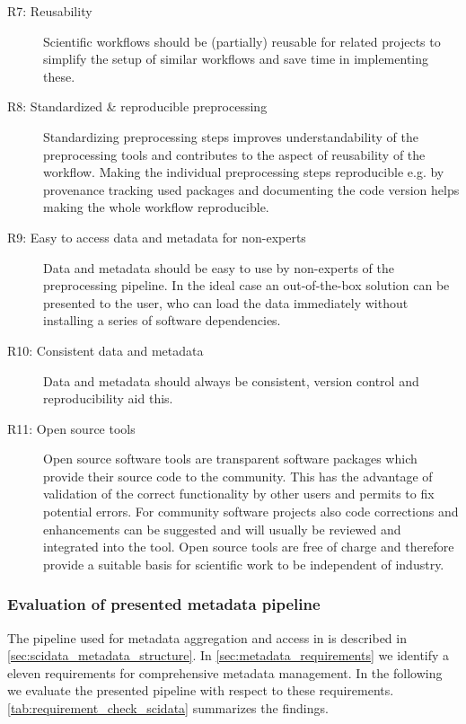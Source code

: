 \begin{description}
 \item[R7: Reusability] Scientific workflows should be (partially) reusable for related projects to simplify the setup of similar workflows and save time in implementing these.
 \item[R8: Standardized \& reproducible preprocessing] Standardizing preprocessing steps improves understandability of the preprocessing tools and contributes to the aspect of reusability of the workflow. Making the individual preprocessing steps reproducible e.g. by provenance tracking used packages and documenting the code version helps making the whole workflow reproducible.
 \item[R9: Easy to access data and metadata for non-experts] Data and metadata should be easy to use by non-experts of the preprocessing pipeline. In the ideal case an out-of-the-box solution can be presented to the user, who can load the data immediately without installing a series of software dependencies. 
 \item[R10: Consistent data and metadata] Data and metadata should always be consistent, version control and reproducibility aid this.
 \item[R11: Open source tools] Open source software tools are transparent software packages which provide their source code to the community. This has the advantage of validation of the correct functionality by other users and permits to fix potential errors. For community software projects also code corrections and enhancements can be suggested and will usually be reviewed and integrated into the tool. Open source tools are free of charge and therefore provide a suitable basis for scientific work to be independent of industry.
\end{description}


\subsubsection{Evaluation of presented metadata pipeline}
\label{sec:r2gpipeline_evaluation}
The pipeline used for metadata aggregation and access in \citet{Brochier_2018} is described in \cref{sec:scidata_metadata_structure}. In \cref{sec:metadata_requirements} we identify a eleven requirements for comprehensive metadata management. In the following we evaluate the presented pipeline with respect to these requirements. \cref{tab:requirement_check_scidata} summarizes the findings.
\newline

